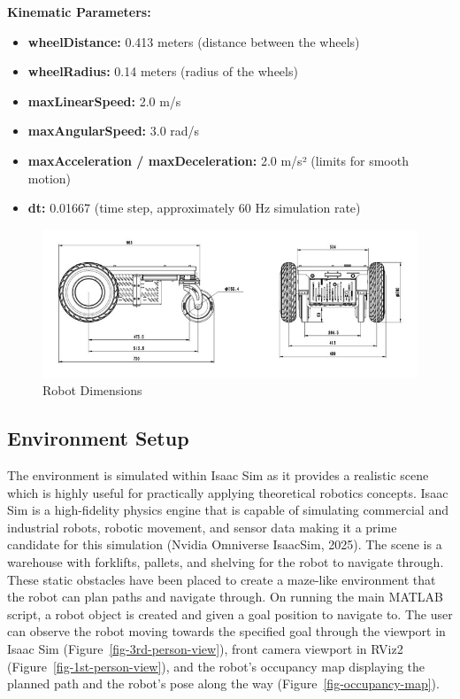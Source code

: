 \documentclass[
  letterpaper,
  DIV=11,
  numbers=noendperiod]{scrartcl}
\providecommand{\tightlist}{%
  \setlength{\itemsep}{0pt}\setlength{\parskip}{0pt}}\usepackage{longtable,booktabs,array}
\begin{document}
\textbf{Kinematic Parameters:}

\begin{itemize}
\tightlist
\item
  \textbf{wheelDistance:} 0.413 meters (distance between the wheels)
\item
  \textbf{wheelRadius:} 0.14 meters (radius of the wheels)
\item
  \textbf{maxLinearSpeed:} 2.0 m/s
\item
  \textbf{maxAngularSpeed:} 3.0 rad/s
\item
  \textbf{maxAcceleration / maxDeceleration:} 2.0 m/s² (limits for
  smooth motion)
\item
  \textbf{dt:} 0.01667 (time step, approximately 60 Hz simulation rate)
\end{itemize}

\begin{figure}

{\centering \includegraphics{robot-dimensions.png}

}

\caption{\label{fig-robot-dimensions}Robot Dimensions}

\end{figure}

\hypertarget{sec-environment-setup}{%
\subsection{Environment Setup}\label{sec-environment-setup}}

The environment is simulated within Isaac Sim as it provides a realistic
scene which is highly useful for practically applying theoretical
robotics concepts. Isaac Sim is a high-fidelity physics engine that is
capable of simulating commercial and industrial robots, robotic
movement, and sensor data making it a prime candidate for this
simulation (Nvidia Omniverse IsaacSim, 2025). The scene is a warehouse
with forklifts, pallets, and shelving for the robot to navigate through.
These static obstacles have been placed to create a maze-like
environment that the robot can plan paths and navigate through. On
running the main MATLAB script, a robot object is created and given a
goal position to navigate to. The user can observe the robot moving
towards the specified goal through the viewport in Isaac Sim
(Figure~\ref{fig-3rd-person-view}), front camera viewport in RViz2
(Figure~\ref{fig-1st-person-view}), and the robot's occupancy map
displaying the planned path and the robot's pose along the way
(Figure~\ref{fig-occupancy-map}).
\end{document}
